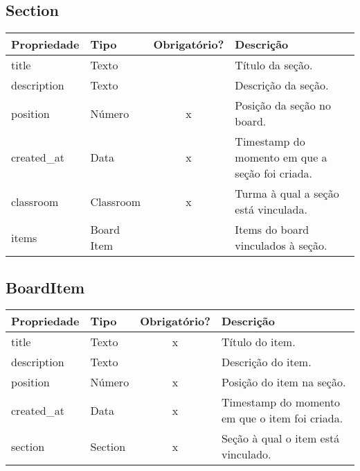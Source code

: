 \subsection{Section} \label{Section}
\begin{table}[H]
	\footnotesize
	\begin{tabularx}{\textwidth}{|X|X|c|p{7.8cm}|}   \hline \rowcolor[rgb]{0.8,0.8,0.8}
		
		\textbf{Propriedade} & \textbf{Tipo} & \textbf{Obrigatório?} & \centerline{\textbf{Descrição}} \\\hline  	
		
		title & Texto & {} & Título da seção. \\\hline		
		description & Texto & {} & Descrição da seção. \\\hline		
		position & Número & x & Posição da seção no board. \\\hline		
		created\_at & Data & x & Timestamp do momento em que a seção foi criada. \\\hline	
		classroom & Classroom & x & Turma à qual a seção está vinculada. \\\hline
		items & Board Item & {} & Items do board vinculados à seção. \\\hline
		
	\end{tabularx}	
\end{table}


\subsection{BoardItem} \label{BoardItem}
\begin{table}[H]
	\footnotesize
	\begin{tabularx}{\textwidth}{|X|X|c|p{7.8cm}|}   \hline \rowcolor[rgb]{0.8,0.8,0.8}
		
		\textbf{Propriedade} & \textbf{Tipo} & \textbf{Obrigatório?} & \centerline{\textbf{Descrição}} \\\hline  	
		
		title & Texto & x & Título do item. \\\hline		
		description & Texto & {} & Descrição do item. \\\hline		
		position & Número & x & Posição do item na seção. \\\hline		
		created\_at & Data & x & Timestamp do momento em que o item foi criada. \\\hline	
		section & Section & x & Seção à qual o item está vinculado. \\\hline
		
	\end{tabularx}	
\end{table}


